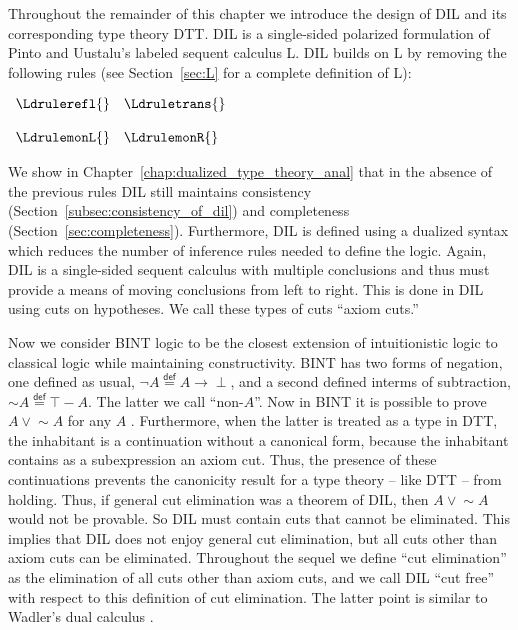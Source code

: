 Throughout the remainder of this chapter we introduce the design of
DIL and its corresponding type theory DTT.  DIL is a single-sided
polarized formulation of Pinto and Uustalu's labeled sequent calculus
L.  DIL builds on L by removing the following rules (see
Section~\ref{sec:L} for a complete definition of L):
\begin{center}
  \begin{math}
    \begin{array}{lll}
      \Ldrulerefl{} & \Ldruletrans{}\\
      & \\
      \LdrulemonL{} & \LdrulemonR{}   
    \end{array}
  \end{math}
\end{center} 
We show in Chapter~\ref{chap:dualized_type_theory_anal} that in the
absence of the previous rules DIL still maintains consistency
(Section~\ref{subsec:consistency_of_dil}) and completeness
(Section~\ref{sec:completeness}).  Furthermore, DIL is defined using a
dualized syntax which reduces the number of inference rules needed to
define the logic.  Again, DIL is a single-sided sequent calculus with
multiple conclusions and thus must provide a means of moving
conclusions from left to right. This is done in DIL using cuts on
hypotheses. We call these types of cuts ``axiom cuts.''

Now we consider BINT logic to be the closest extension of
intuitionistic logic to classical logic while maintaining
constructivity.  BINT has two forms of negation, one defined as usual,
$\lnot A \stackrel{\mathsf{def}}{=} A \to \perp$, and a second defined
interms of subtraction, $\mathop{\sim} A \stackrel{\mathsf{def}}{=}
\top - A$.  The latter we call ``non-$A$''.  Now in BINT it is
possible to prove $A \lor \mathop{\sim} A$ for any $A$
\cite{crolard01}. Furthermore, when the latter is treated as a type in
DTT, the inhabitant is a continuation without a canonical form,
because the inhabitant contains as a subexpression an axiom cut.
Thus, the presence of these continuations prevents the canonicity
result for a type theory -- like DTT -- from holding.  Thus, if
general cut elimination was a theorem of DIL, then $A \lor
\mathop{\sim} A$ would not be provable.  So DIL must contain cuts
that cannot be eliminated.  This implies that DIL does not enjoy
general cut elimination, but all cuts other than axiom cuts can be
eliminated. Throughout the sequel we define ``cut elimination'' as the
elimination of all cuts other than axiom cuts, and we call DIL ``cut
free'' with respect to this definition of cut elimination. The latter
point is similar to Wadler's dual calculus \cite{Wadler:2005}.

